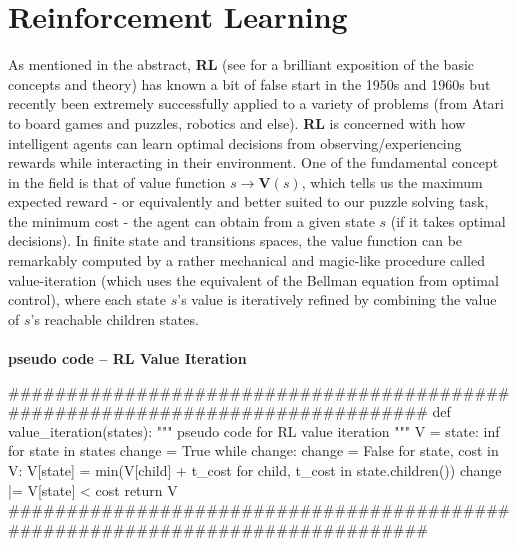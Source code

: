 

\section{Reinforcement Learning}
\label{sec:RLTheory}

As mentioned in the abstract, \textbf{RL} (see \cite{Sutton1998} for a brilliant exposition of the basic concepts and theory) has known a bit of false start in the 1950s and 1960s but recently been extremely successfully applied to a variety of problems (from Atari to board games and puzzles, robotics and else). \textbf{RL} is concerned with how intelligent agents can learn optimal decisions from observing/experiencing rewards while interacting in their environment. One of the fundamental concept in the field is that of value function $s \to \textbf{V}(s)$, which tells us the maximum expected reward - or equivalently and better suited to our puzzle solving task, the minimum cost - the agent can obtain from a given state $s$ (if it takes optimal decisions). In finite state and transitions spaces, the value function can be remarkably computed by a rather mechanical and magic-like procedure called value-iteration (which uses the equivalent of the Bellman equation from optimal control), where each state $s$'s value is iteratively refined by combining the value of $s$'s reachable children states.
\afblue
\paragraph{}{\textbf{pseudo code -- \textbf{RL} Value Iteration}}
\begin{python}
###############################################################################
def value_iteration(states):
    """ pseudo code for RL value iteration """
    V = {state: inf for state in states}
    change = True
    while change:
        change = False
        for state, cost in V:
            V[state] = min(V[child] + t_cost for child, t_cost in state.children())
            change |= V[state] < cost
    return V 
###############################################################################
\end{python}
\black





